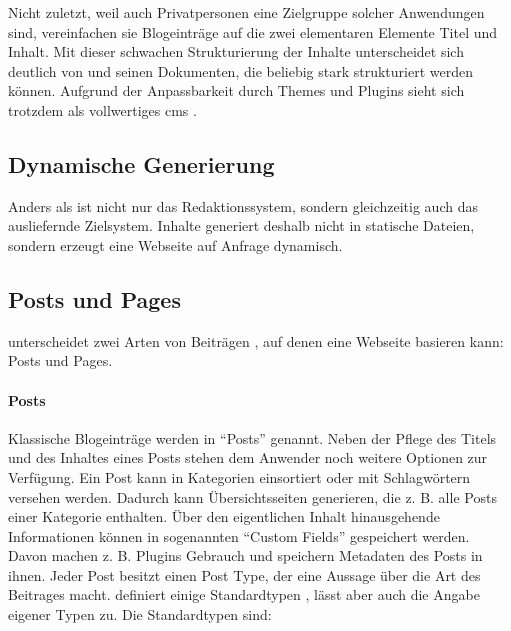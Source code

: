         Nicht zuletzt, weil auch Privatpersonen eine Zielgruppe
        solcher Anwendungen sind, vereinfachen sie Blogeinträge
        auf die zwei elementaren Elemente Titel und Inhalt.
        Mit dieser schwachen Strukturierung der Inhalte
        unterscheidet sich {\wordpress} deutlich von {\imperia}
        und seinen Dokumenten, die beliebig stark strukturiert
        werden können.
        Aufgrund der Anpassbarkeit durch Themes
        und Plugins sieht sich
        {\wordpress} trotzdem als vollwertiges \gls{cms}
        \cite{wordpress:About}.

    \subsection{Dynamische Generierung}
        \label{section:problemAnalysisWordPressDynamicGeneration}
        Anders als {\imperia} ist {\wordpress} nicht nur das Redaktionssystem,
        sondern gleichzeitig auch das ausliefernde Zielsystem.
        Inhalte generiert {\wordpress} deshalb nicht in statische Dateien,
        sondern erzeugt eine Webseite auf Anfrage dynamisch.

    \subsection{Posts und Pages}
        \label{section:wordpressPostsPages}
        {\wordpress} unterscheidet zwei Arten von Beiträgen \cite[Kapitel "`Pages"']{wordpress:codex},
        auf denen eine Webseite basieren kann: Posts
        und Pages.

        \paragraph*{Posts}
        Klassische Blogeinträge werden in {\wordpress} "`Posts"' genannt.
        Neben der Pflege des Titels und des Inhaltes eines Posts stehen dem
        Anwender noch weitere Optionen zur Verfügung.
        Ein Post kann in Kategorien einsortiert oder mit Schlagwörtern versehen werden.
        Dadurch kann {\wordpress} Übersichtsseiten generieren,
        die z. B. alle Posts einer Kategorie enthalten.
        Über den eigentlichen Inhalt hinausgehende Informationen können
        in sogenannten "`Custom Fields"' gespeichert werden.
        Davon machen z. B. Plugins Gebrauch
        und speichern Metadaten des Posts in ihnen.
        Jeder Post besitzt einen Post Type,
        der eine Aussage über die Art des Beitrages macht.
        {\wordpress} definiert einige Standardtypen \cite[Kapitel "`Post Types"']{wordpress:codex},
        lässt aber auch die Angabe eigener Typen zu.
        Die Standardtypen sind:

